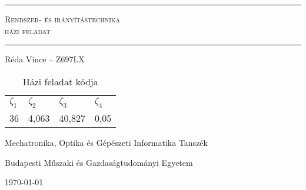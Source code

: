 \begin{titlepage}
\begin{center}

\vspace*{1cm}

{\hrule height 1pt}
\vspace{3mm}
\Huge
\textsc{Rendszer- és irányítástechnika}\\
\Large
\textsc{házi feladat}
\vspace{6mm}
{\hrule height 1pt}
\vspace{14mm}

\Large
Réda Vince -- Z697LX
\normalsize
\vspace{2cm}

\vfill
\begin{table}[H]
\begin{tabular}{llll}
\toprule
$\zeta_1$& $\zeta_2$& $\zeta_3$& $\zeta_4$\\
36& 4,063& 40,827& 0,05\\
\bottomrule
\end{tabular}
\caption{Házi feladat kódja}
\end{table}
\vspace{1cm}

\large
Mechatronika, Optika és Gépészeti Informatika Tanszék

Budapesti Műszaki és Gazdaságtudományi Egyetem

\vspace{5mm}
\today

\end{center}
\end{titlepage}
